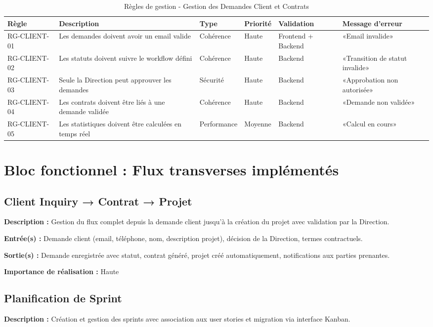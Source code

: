 \begin{table}[H]
\centering
\footnotesize
\begin{tabular}{|p{1.5cm}|p{3.5cm}|p{1.5cm}|p{1.5cm}|p{2cm}|p{2.5cm}|}
\hline
\textbf{Règle} & \textbf{Description} & \textbf{Type} & \textbf{Priorité} & \textbf{Validation} & \textbf{Message d'erreur} \\
\hline
RG-CLIENT-01 & Les demandes doivent avoir un email valide & Cohérence & Haute & Frontend + Backend & «Email invalide» \\
\hline
RG-CLIENT-02 & Les statuts doivent suivre le workflow défini & Cohérence & Haute & Backend & «Transition de statut invalide» \\
\hline
RG-CLIENT-03 & Seule la Direction peut approuver les demandes & Sécurité & Haute & Backend & «Approbation non autorisée» \\
\hline
RG-CLIENT-04 & Les contrats doivent être liés à une demande validée & Cohérence & Haute & Backend & «Demande non validée» \\
\hline
RG-CLIENT-05 & Les statistiques doivent être calculées en temps réel & Performance & Moyenne & Backend & «Calcul en cours» \\
\hline
\end{tabular}
\caption{Règles de gestion - Gestion des Demandes Client et Contrats}
\label{tab:rg_client}
\end{table}

\section{Bloc fonctionnel : Flux transverses implémentés}

\subsection{Client Inquiry → Contrat → Projet}
\textbf{Description :} Gestion du flux complet depuis la demande client jusqu'à la création du projet avec validation par la Direction.

\textbf{Entrée(s) :} Demande client (email, téléphone, nom, description projet), décision de la Direction, termes contractuels.

\textbf{Sortie(s) :} Demande enregistrée avec statut, contrat généré, projet créé automatiquement, notifications aux parties prenantes.

\textbf{Importance de réalisation :} Haute

\subsection{Planification de Sprint}
\textbf{Description :} Création et gestion des sprints avec association aux user stories et migration via interface Kanban.

